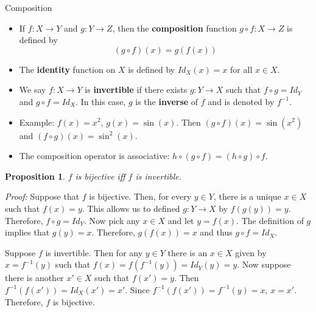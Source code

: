 \documentclass[9pt,aspectratio=169]{beamer}
\newtheorem{proposition}[theorem]{Proposition}
\begin{document}
\begin{frame}[allowframebreaks]{Composition}
    \begin{definition}
        \begin{itemize}
            \item If $f: X \to Y$ and $g: Y\to Z$, then the \textbf{composition}
            function $g\circ f: X \to Z$ is defined by
            \begin{equation*}
                (g\circ f)(x) = g(f(x))
            \end{equation*}
            \item The \textbf{identity} function on $X$ is defined by
            $Id_X(x) = x$ for all $x \in X$.
            \item We say $f: X \to Y$ is \textbf{invertible} if there exists
            $g: Y \to X$ such that $f \circ g = Id_Y$ and $g \circ f = Id_X$.
            In this case, $g$ is the \textbf{inverse} of $f$ and is denoted
            by $f^{-1}$.
        \end{itemize}        
    \end{definition}
    \begin{itemize}
        \item Example: $f(x) = x^2$, $g(x) = \sin(x)$. Then $(g\circ f)(x) =
        \sin(x^2)$ and $(f\circ g)(x) = \sin^2 (x)$.
        \item The composition operator is associative: $h\circ(g\circ f) =
        (h\circ g)\circ f$.
    \end{itemize}
    \framebreak
    \begin{proposition}
        $f$ is bijective iff $f$ is invertible.
    \end{proposition}
    \emph{Proof:} Suppose that $f$ is bijective. Then, for every $y \in Y$,
    there is a unique $x \in X$ such that $f(x) = y$. This allows us to
    defined $g: Y \to X$ by $f(g(y)) = y$. Therefore, $f\circ g = Id_Y$. Now
    pick any $x \in X$ and let $y = f(x)$. The definition of $g$ implies that
    $g(y) = x$. Therefore, $g(f(x)) = x$ and thus $g \circ f = Id_X$.

    Suppose $f$ is invertible. Then for any $y \in Y$ there is an $x \in X$
    given by $x = f^{-1}(y)$ such that $f(x) = f(f^{-1}(y)) = Id_Y(y) = y$.
    Now suppose there is another $x' \in X$ such that $f(x') = y$. Then
    $f^{-1}(f(x')) = Id_X(x') = x'$. Since $f^{-1}(f(x')) = f^{-1}(y) = x$,
    $x = x'$. Therefore, $f$ is bijective.
\end{frame}
\end{document}
